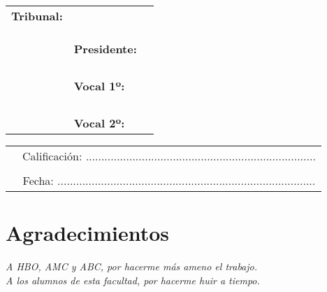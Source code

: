 \vspace{1cm}
\begin{center}
  \begin{tabular}{rll}
    \textbf{Tribunal:} & &\\ \\ \\
    &&\\
    & \textbf{Presidente:} \\ \\ \\
    \\
    &&\\
    & \textbf{Vocal 1º:}& \\ \\ \\
    \\
    &&\\
    & \textbf{Vocal 2º:}& 
  \end{tabular}
\end{center}


\vspace{15mm}
\begin{tabular}{p{3cm}c}
  &Calificación: ..........................................................................\\ \\
  &Fecha: ...................................................................................
\end{tabular}

\normalsize





\clearemptydoublepage
\chapter*{Agradecimientos}

\begin{flushright}
  \vspace{10mm}
  \emph{A HBO, AMC y ABC, por hacerme más ameno el trabajo.}\hspace{1cm}\\
  \emph{A los alumnos de esta facultad, por hacerme huir a tiempo.}\hspace{1cm}\\
\end{flushright}


